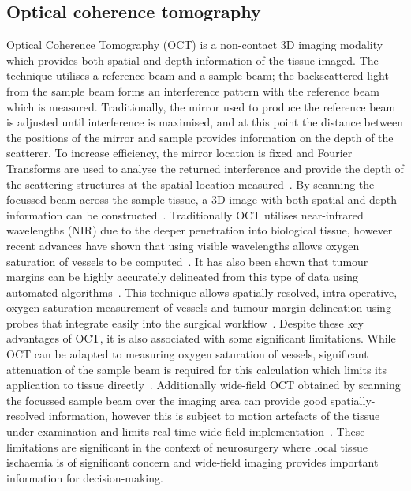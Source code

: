 \subsection{Optical coherence tomography}
Optical Coherence Tomography (OCT) is a non-contact 3D imaging modality which provides both spatial and depth information of the tissue imaged. The technique utilises a reference beam and a sample beam; the backscattered light from the sample beam forms an interference pattern with the reference beam which is measured. Traditionally, the mirror used to produce the reference beam is adjusted until interference is maximised, and at this point the distance between the positions of the mirror and sample provides information on the depth of the scatterer. To increase efficiency, the mirror location is fixed and Fourier Transforms are used to analyse the returned interference and provide the depth of the scattering structures at the spatial location measured~\citep{Fercher2003}. By scanning the focussed beam across the sample tissue, a 3D image with both spatial and depth information can be constructed~\citep{Fercher2003}. Traditionally OCT utilises near-infrared wavelengths (NIR) due to the deeper penetration into biological tissue, however recent advances have shown that using visible wavelengths allows oxygen saturation of vessels to be computed~\citep{Shu2017}. It has also been shown that tumour margins can be highly accurately delineated from this type of data using automated algorithms~\citep{Sunny2019}. 
This technique allows spatially-resolved, intra-operative, oxygen saturation measurement of vessels and tumour margin delineation using probes that integrate easily into the surgical workflow~\citep{Jansen2018}. Despite these key advantages of OCT, it is also associated with some significant limitations. While OCT can be adapted to measuring oxygen saturation of vessels, significant attenuation of the sample beam is required for this calculation which limits its application to tissue directly~\citep{Shu2017}. Additionally wide-field OCT obtained by scanning the focussed sample beam over the imaging area can provide good spatially-resolved information, however this is subject to motion artefacts of the tissue under examination and limits real-time wide-field implementation~\citep{Yu2015}. These limitations are significant in the context of neurosurgery where local tissue ischaemia is of significant concern and wide-field imaging provides important information for decision-making. 

